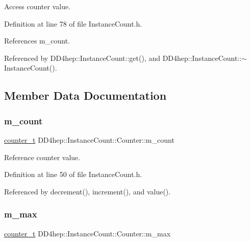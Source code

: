 Access counter value. 



Definition at line 78 of file Instance\+Count.\+h.



References m\+\_\+count.



Referenced by D\+D4hep\+::\+Instance\+Count\+::get(), and D\+D4hep\+::\+Instance\+Count\+::$\sim$\+Instance\+Count().



\subsection{Member Data Documentation}
\hypertarget{class_d_d4hep_1_1_instance_count_1_1_counter_add94845aa9120ee3daa350d46f2ee919}{}\label{class_d_d4hep_1_1_instance_count_1_1_counter_add94845aa9120ee3daa350d46f2ee919} 
\subsubsection{\texorpdfstring{m\+\_\+count}{m\_count}}
{\footnotesize\ttfamily \hyperlink{struct_d_d4hep_1_1_instance_count_ae81dc0c76b135425e14b6dc38262a727}{counter\+\_\+t} D\+D4hep\+::\+Instance\+Count\+::\+Counter\+::m\+\_\+count\hspace{0.3cm}{\ttfamily [private]}}



Reference counter value. 



Definition at line 50 of file Instance\+Count.\+h.



Referenced by decrement(), increment(), and value().

\hypertarget{class_d_d4hep_1_1_instance_count_1_1_counter_a037706f44071d417950579ff8627732b}{}\label{class_d_d4hep_1_1_instance_count_1_1_counter_a037706f44071d417950579ff8627732b} 
\subsubsection{\texorpdfstring{m\+\_\+max}{m\_max}}
{\footnotesize\ttfamily \hyperlink{struct_d_d4hep_1_1_instance_count_ae81dc0c76b135425e14b6dc38262a727}{counter\+\_\+t} D\+D4hep\+::\+Instance\+Count\+::\+Counter\+::m\+\_\+max\hspace{0.3cm}{\ttfamily [private]}}



